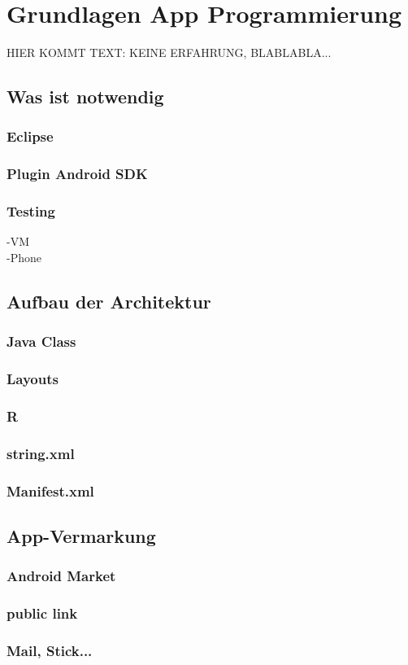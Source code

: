 \chapter{Grundlagen App Programmierung}
\label{sec:GrundlagenAppProgrammierung}

HIER KOMMT TEXT: KEINE ERFAHRUNG, BLABLABLA...

\section{Was ist notwendig}


\subsection{Eclipse}


\subsection{Plugin Android SDK}


\subsection{Testing}
-VM \\
-Phone\\

\section{Aufbau der Architektur}


\subsection{Java Class}


\subsection{Layouts}


\subsection{R}

\subsection{string.xml}



\subsection{Manifest.xml}




\section{App-Vermarkung}

\subsection{Android Market}

\subsection{public link}

\subsection{Mail, Stick...}